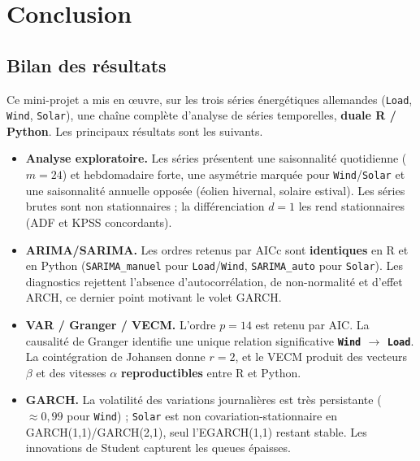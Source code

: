 \section{Conclusion}
\label{sec:conclusion}

\subsection{Bilan des résultats}
Ce mini-projet a mis en \oe{}uvre, sur les trois séries énergétiques
allemandes (\texttt{Load}, \texttt{Wind}, \texttt{Solar}), une chaîne complète
d'analyse de séries temporelles, \textbf{duale R / Python}. Les principaux
résultats sont les suivants.

\begin{itemize}
  \item \textbf{Analyse exploratoire.} Les séries présentent une saisonnalité
        quotidienne (\(m=24\)) et hebdomadaire forte, une asymétrie marquée
        pour \texttt{Wind}/\texttt{Solar} et une saisonnalité annuelle
        opposée (éolien hivernal, solaire estival). Les séries brutes sont
        non stationnaires ; la différenciation \(d=1\) les rend stationnaires
        (ADF et KPSS concordants).

  \item \textbf{ARIMA/SARIMA.} Les ordres retenus par AICc sont
        \textbf{identiques} en R et en Python
        (\texttt{SARIMA\_manuel} pour \texttt{Load}/\texttt{Wind},
        \texttt{SARIMA\_auto} pour \texttt{Solar}). Les diagnostics rejettent
        l'absence d'autocorrélation, de non-normalité et d'effet ARCH, ce
        dernier point motivant le volet GARCH.

  \item \textbf{VAR / Granger / VECM.} L'ordre \(p=14\) est retenu par AIC.
        La causalité de Granger identifie une unique relation significative
        \textbf{\texttt{Wind} \(\to\) \texttt{Load}}. La cointégration de
        Johansen donne \(r=2\), et le VECM produit des vecteurs \(\beta\) et des
        vitesses \(\alpha\) \textbf{reproductibles} entre R et Python.

  \item \textbf{GARCH.} La volatilité des variations journalières est très
        persistante (\(\approx 0{,}99\) pour \texttt{Wind}) ; \texttt{Solar}
        est non covariation-stationnaire en GARCH(1,1)/GARCH(2,1), seul
        l'EGARCH(1,1) restant stable. Les innovations de Student capturent les
        queues épaisses.


\end{itemize}
